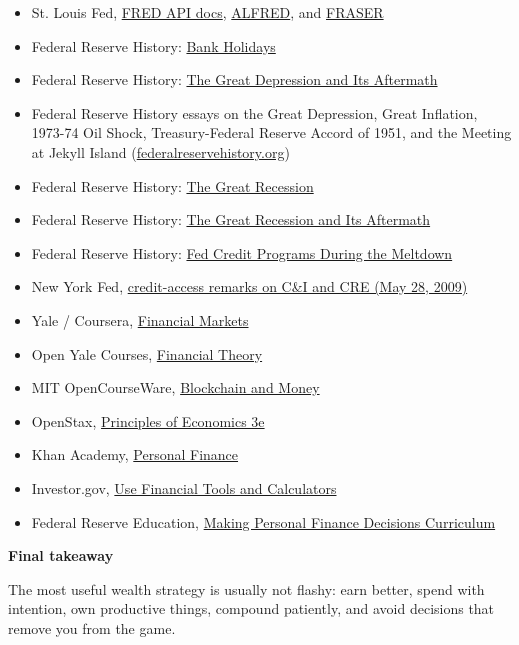 \documentclass[11pt,openany]{book}
\begin{document}
\begin{itemize}
  \item St. Louis Fed, \href{https://fred.stlouisfed.org/docs/api/fred/fred/}{FRED API docs}, \href{https://alfred.stlouisfed.org/help/downloaddata}{ALFRED}, and \href{https://fraser.stlouisfed.org/}{FRASER}
  \item Federal Reserve History: \href{https://www.federalreservehistory.org/essays/bank-holidays}{Bank Holidays}
  \item Federal Reserve History: \href{https://www.federalreservehistory.org/time-period/the-great-depression-and-its-aftermath}{The Great Depression and Its Aftermath}
  \item Federal Reserve History essays on the Great Depression, Great Inflation, 1973-74 Oil Shock, Treasury-Federal Reserve Accord of 1951, and the Meeting at Jekyll Island (\href{https://www.federalreservehistory.org/}{federalreservehistory.org})
  \item Federal Reserve History: \href{https://www.federalreservehistory.org/essays/great-recession-of-200709}{The Great Recession}
  \item Federal Reserve History: \href{https://www.federalreservehistory.org/time-period/great-recession-and-its-aftermath}{The Great Recession and Its Aftermath}
  \item Federal Reserve History: \href{https://www.federalreservehistory.org/essays/fed-credit-programs}{Fed Credit Programs During the Meltdown}
  \item New York Fed, \href{https://www.newyorkfed.org/newsevents/speeches/2009/sch090528}{credit-access remarks on C\&I and CRE (May 28, 2009)}
\item Yale / Coursera, \href{https://www.coursera.org/learn/financial-markets-global}{Financial Markets}
  \item Open Yale Courses, \href{https://oyc.yale.edu/economics/econ-251}{Financial Theory}
  \item MIT OpenCourseWare, \href{https://ocw.mit.edu/courses/15-s12-blockchain-and-money-fall-2018/}{Blockchain and Money}
  \item OpenStax, \href{https://openstax.org/books/principles-economics-3e/pages/preface}{Principles of Economics 3e}
  \item Khan Academy, \href{https://www.khanacademy.org/college-careers-more/personal-finance}{Personal Finance}
  \item Investor.gov, \href{https://www.investor.gov/use-financial-tools-and-calculators}{Use Financial Tools and Calculators}
  \item Federal Reserve Education, \href{https://www.federalreserveeducation.org/teaching-resources/personal-finance/curriculum/making-personal-finance-decisions-curriculum}{Making Personal Finance Decisions Curriculum}
\end{itemize}

\backmatter

\begin{signalbox}
\textbf{Final takeaway}\par
The most useful wealth strategy is usually not flashy: earn better, spend with intention, own productive things, compound patiently, and avoid decisions that remove you from the game.
\end{signalbox}
\end{document}
